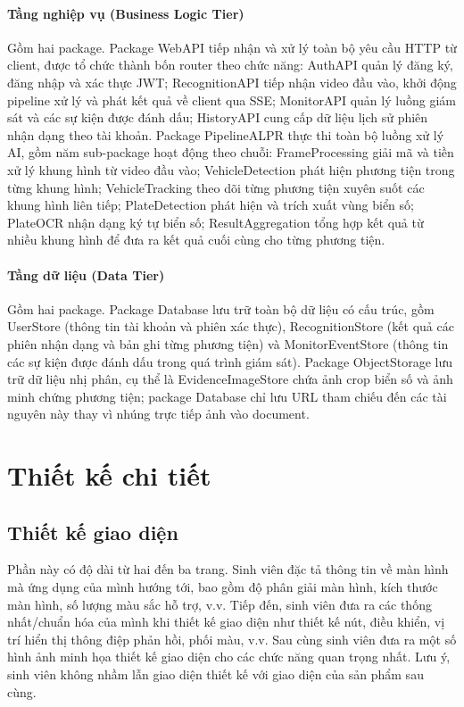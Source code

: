 \documentclass[../DoAn.tex]{subfiles}
\begin{document}
\paragraph{Tầng nghiệp vụ (Business Logic Tier)}
Gồm hai package. Package WebAPI tiếp nhận và xử lý toàn bộ yêu cầu HTTP từ client, được tổ chức thành bốn router theo chức năng: AuthAPI quản lý đăng ký, đăng nhập và xác thực JWT; RecognitionAPI tiếp nhận video đầu vào, khởi động pipeline xử lý và phát kết quả về client qua SSE; MonitorAPI quản lý luồng giám sát và các sự kiện được đánh dấu; HistoryAPI cung cấp dữ liệu lịch sử phiên nhận dạng theo tài khoản. Package PipelineALPR thực thi toàn bộ luồng xử lý AI, gồm năm sub-package hoạt động theo chuỗi: FrameProcessing giải mã và tiền xử lý khung hình từ video đầu vào; VehicleDetection phát hiện phương tiện trong từng khung hình; VehicleTracking theo dõi từng phương tiện xuyên suốt các khung hình liên tiếp; PlateDetection phát hiện và trích xuất vùng biển số; PlateOCR nhận dạng ký tự biển số; ResultAggregation tổng hợp kết quả từ nhiều khung hình để đưa ra kết quả cuối cùng cho từng phương tiện.
\paragraph{Tầng dữ liệu (Data Tier)}
Gồm hai package. Package Database lưu trữ toàn bộ dữ liệu có cấu trúc, gồm UserStore (thông tin tài khoản và phiên xác thực), RecognitionStore (kết quả các phiên nhận dạng và bản ghi từng phương tiện) và MonitorEventStore (thông tin các sự kiện được đánh dấu trong quá trình giám sát). Package ObjectStorage lưu trữ dữ liệu nhị phân, cụ thể là EvidenceImageStore chứa ảnh crop biển số và ảnh minh chứng phương tiện; package Database chỉ lưu URL tham chiếu đến các tài nguyên này thay vì nhúng trực tiếp ảnh vào document.
\section{Thiết kế chi tiết}
\subsection{Thiết kế giao diện}
Phần này có độ dài từ hai đến ba trang. Sinh viên đặc tả thông tin về màn hình mà ứng dụng của mình hướng tới, bao gồm độ phân giải màn hình, kích thước màn hình, số lượng màu sắc hỗ trợ, v.v. Tiếp đến, sinh viên đưa ra các thống nhất/chuẩn hóa của mình khi thiết kế giao diện như thiết kế nút, điều khiển, vị trí hiển thị thông điệp phản hồi, phối màu, v.v. Sau cùng sinh viên đưa ra một số hình ảnh minh họa thiết kế giao diện cho các chức năng quan trọng nhất. Lưu ý, sinh viên không nhầm lẫn giao diện thiết kế với giao diện của sản phẩm sau cùng.
\end{document}
